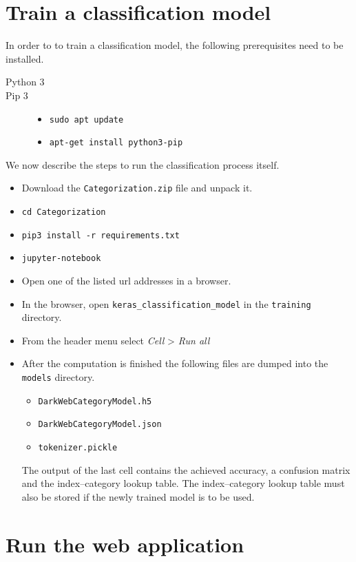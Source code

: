 \begin{appendices}
\chapter{Train a classification model}
In order to to train a classification model, the following prerequisites need to be installed.
\begin{description}
    \item[Python 3] \hfill
    \item[Pip 3] \hfill
        \begin{itemize}
	 \item \texttt{sudo apt update}
            \item \texttt{apt-get install python3-pip}
        \end{itemize}
\end{description}
We now describe the steps to run the classification process itself.
\begin{itemize}
    \item Download the \texttt{Categorization.zip} file and unpack it.
    \item \texttt{cd Categorization}
    \item \texttt{pip3 install -r requirements.txt}
    \item \texttt{jupyter-notebook}
    \item Open one of the listed url addresses in a browser.
    \item In the browser, open \texttt{keras\_classification\_model} in the \texttt{training} directory.
    \item From the header menu select \textit{Cell} > \textit{Run all}
    \item After the computation is finished the following files are dumped into the \texttt{models} directory.
        \begin{itemize}
            \item \texttt{DarkWebCategoryModel.h5}
            \item \texttt{DarkWebCategoryModel.json}
            \item \texttt{tokenizer.pickle}
        \end{itemize}
The output of the last cell contains the achieved accuracy,  a confusion matrix and the index--category lookup table. The index--category lookup table must also be stored if the newly trained model is to be used.
\end{itemize}



\chapter{Run the web application}

\end{appendices}

